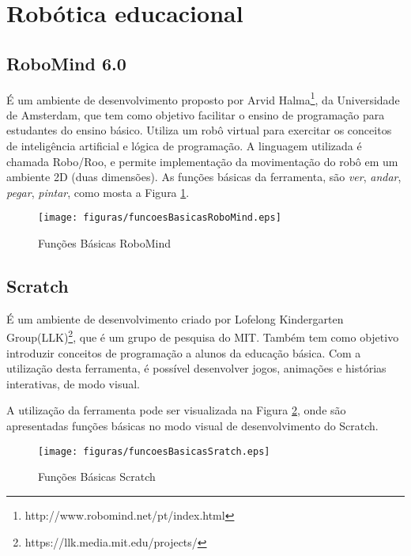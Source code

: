 \section{Robótica educacional} %
\label{sec:robótica_educacional_suporte}

	\subsection{RoboMind 6.0} %
	\label{sub:robomind}

		É um ambiente de desenvolvimento proposto por Arvid Halma\footnote{http://www.robomind.net/pt/index.html}, da Universidade de Amsterdam, que tem como objetivo facilitar o ensino de programação para estudantes do ensino básico. Utiliza um robô virtual para exercitar os conceitos de inteligência artificial e lógica de programação. A linguagem utilizada é chamada Robo/Roo, e permite implementação da movimentação do robô em um ambiente 2D (duas dimensões). As funções básicas da ferramenta, são \textit{ver}, \textit{andar}, \textit{pegar}, \textit{pintar}, como mosta a Figura \ref{img:funcoesBasicasRoboMind}.

		\begin{figure}[H]
			\centering
			\texttt{[image: figuras/funcoesBasicasRoboMind.eps]}
			\caption[Funções Básicas RoboMind]{Funções Básicas RoboMind}
			\label{img:funcoesBasicasRoboMind}
		\end{figure}


	\subsection{Scratch} %
	\label{sub:scratch}

		É um ambiente de desenvolvimento criado por Lofelong Kindergarten Group(LLK)\footnote{https://llk.media.mit.edu/projects/}, que é um grupo de pesquisa do MIT. Também tem como objetivo introduzir conceitos de programação a alunos da educação básica. Com a utilização desta ferramenta, é possível desenvolver jogos, animações e histórias interativas, de modo visual.

		A utilização da ferramenta pode ser visualizada na Figura \ref{img:funcoesBasicasScratch}, onde são apresentadas funções básicas no modo visual de desenvolvimento do Scratch.

		\begin{figure}[H]
			\centering
			\texttt{[image: figuras/funcoesBasicasSratch.eps]}
			\caption[Funções Básicas Scratch]{Funções Básicas Scratch}
			\label{img:funcoesBasicasScratch}
		\end{figure}

